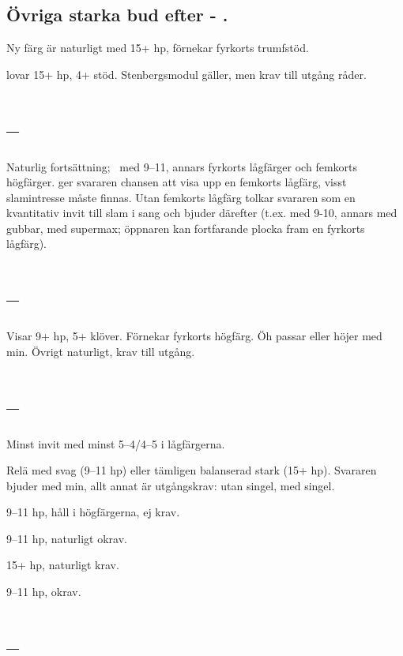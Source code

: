 \subsection{Övriga starka bud efter  - .}

Ny f\"arg \"ar natur\-ligt med 15+ hp, f\"or\-nekar fyrkorts trumf\-st{\"o}d.

 lovar 15+ hp, 4+ stöd. Stenbergsmodul gäller, men krav till utgång
råder. 

\section{ -- }

Naturlig forts\"attning; \pass\ med 9--11,
annars fyrkorts l{\aa}gf\"arger och femkorts h\"ogf\"arger.
 ger svararen chansen att
visa upp en femkorts l{\aa}gf\"arg, visst slamintresse m{\aa}ste finnas.
Utan femkorts l{\aa}gf\"arg tolkar svararen  som en kvantitativ invit
till slam i sang och bjuder d\"arefter (t.ex.  med 9-10, annars
 med gubbar,  med supermax; \"oppnaren kan fortfarande
plocka fram en fyrkorts l{\aa}gf\"arg).

\section{ -- }

Visar 9+ hp, 5+ klöver. Förnekar fyrkorts högfärg. Öh passar eller höjer
med min. Övrigt naturligt, krav till utgång.

\section{ -- }

Minst invit med minst 5--4/4--5 i lågfärgerna.
\bbe
\item[\spa{2}] Relä med svag (9--11 hp) eller tämligen balanserad stark
  (15+ hp). Svararen bjuder  med min, allt annat är utgångskrav:
   utan singel,   med singel.
\item[\NT{2}] 9--11 hp, håll i högfärgerna, ej krav.
\item[\la{3}] 9--11 hp, naturligt okrav.
\item[\ho{3}] 15+ hp, naturligt krav.
\item[\NT{3}] 9--11 hp, okrav.
\ebe

\section{ -- }
  
